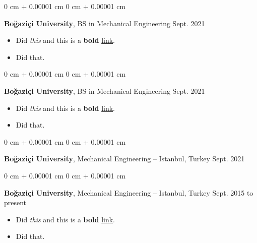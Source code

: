 \documentclass[10pt, letterpaper]{article}
\newenvironment{highlights}{
    \begin{itemize}[
        topsep=0.10 cm,
        parsep=0.10 cm,
        partopsep=0pt,
        itemsep=0pt,
        leftmargin=0 cm + 10pt
    ]
}{
    \end{itemize}
        
    \vspace{-0.20cm}
} %
\newenvironment{onecolentry}{
    \begin{adjustwidth}{
        0 cm + 0.00001 cm
    }{
        0 cm + 0.00001 cm
    }
}{
    \end{adjustwidth}
} %
\begin{document}
        \vspace{0.1 cm}

        \begin{onecolentry}
            \textbf{Boğaziçi University}, BS in Mechanical Engineering \hfill Sept. 2021
            \begin{highlights}
                \item Did \textit{this} and this is a \textbf{bold} \href{https://example.com}{link}.
                \item Did that.
            \end{highlights}
        \end{onecolentry}

        \vspace{0.1 cm}

        \begin{onecolentry}
            \textbf{Boğaziçi University}, BS in Mechanical Engineering \hfill Sept. 2021
            \begin{highlights}
                \item Did \textit{this} and this is a \textbf{bold} \href{https://example.com}{link}.
                \item Did that.
            \end{highlights}
        \end{onecolentry}

        \vspace{0.1 cm}

        \begin{onecolentry}
            \textbf{Boğaziçi University}, Mechanical Engineering -- Istanbul, Turkey \hfill Sept. 2021
        \end{onecolentry}

        \vspace{0.1 cm}

        \begin{onecolentry}
            \textbf{Boğaziçi University}, Mechanical Engineering -- Istanbul, Turkey \hfill Sept. 2015 to present
            \begin{highlights}
                \item Did \textit{this} and this is a \textbf{bold} \href{https://example.com}{link}.
                \item Did that.
            \end{highlights}
        \end{onecolentry}

        \vspace{0.1 cm}
\end{document}
